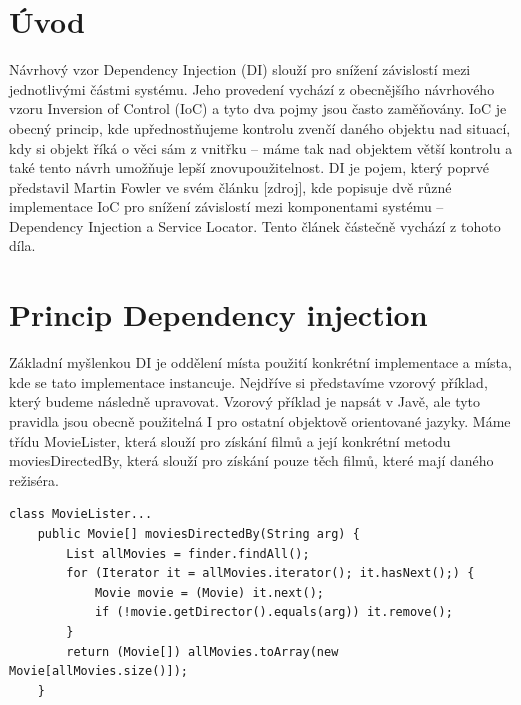 \documentclass[a4paper,conference]{IEEEtran}
\begin{document}
\section{Úvod}
Návrhový vzor Dependency Injection (DI) slouží pro snížení závislostí mezi jednotlivými částmi systému. Jeho provedení vychází z obecnějšího návrhového vzoru Inversion of Control (IoC) a tyto dva pojmy jsou často zaměňovány.
IoC je obecný princip, kde upřednostňujeme kontrolu zvenčí daného objektu nad situací, kdy si objekt říká o věci sám z vnitřku – máme tak nad objektem větší kontrolu a také tento návrh umožňuje lepší znovupoužitelnost.
DI je pojem, který poprvé představil Martin Fowler ve svém článku [zdroj], kde popisuje dvě různé implementace IoC pro snížení závislostí mezi komponentami systému – Dependency Injection a Service Locator. Tento článek částečně vychází z tohoto díla.

\section{Princip Dependency injection}
Základní myšlenkou DI je oddělení místa použití konkrétní implementace a místa, kde se tato implementace instancuje. Nejdříve si představíme vzorový příklad, který budeme následně upravovat. Vzorový příklad je napsát v Javě, ale tyto pravidla jsou obecně použitelná I pro ostatní objektově orientované jazyky.
Máme třídu MovieLister, která slouží pro získání filmů a její konkrétní metodu moviesDirectedBy, která slouží pro získání pouze těch filmů, které mají daného režiséra.

\begin{lstlisting}
class MovieLister...
    public Movie[] moviesDirectedBy(String arg) {
        List allMovies = finder.findAll();
        for (Iterator it = allMovies.iterator(); it.hasNext();) {
            Movie movie = (Movie) it.next();
            if (!movie.getDirector().equals(arg)) it.remove();
        }
        return (Movie[]) allMovies.toArray(new Movie[allMovies.size()]);
    }
\end{lstlisting}
\end{document}
